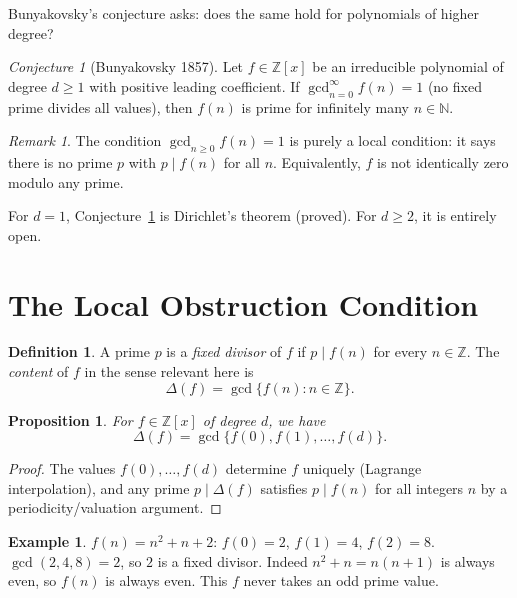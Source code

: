 \documentclass[12pt,a4paper]{amsart}
\newtheorem{proposition}[theorem]{Proposition}
\theoremstyle{definition}
\newtheorem{definition}[theorem]{Definition}
\newtheorem{example}[theorem]{Example}
\theoremstyle{remark}
\newtheorem{remark}[theorem]{Remark}
\newtheorem{conjecture}[theorem]{Conjecture}
\newcommand{\N}{\mathbb{N}}
\newcommand{\Z}{\mathbb{Z}}
\begin{document}
Bunyakovsky's conjecture asks: does the same hold for polynomials of higher degree?

\begin{conjecture}[Bunyakovsky 1857]
\label{conj:buny}
Let $f \in \Z[x]$ be an irreducible polynomial of degree $d \geq 1$
with positive leading coefficient.
If $\gcd_{n=0}^{\infty} f(n) = 1$ (no fixed prime divides all values),
then $f(n)$ is prime for infinitely many $n \in \N$.
\end{conjecture}

\begin{remark}
The condition $\gcd_{n \geq 0} f(n) = 1$ is purely a local condition:
it says there is no prime $p$ with $p \mid f(n)$ for all $n$.
Equivalently, $f$ is not identically zero modulo any prime.
\end{remark}

For $d = 1$, Conjecture~\ref{conj:buny} is Dirichlet's theorem (proved).
For $d \geq 2$, it is entirely open.

\section{The Local Obstruction Condition}

\begin{definition}
A prime $p$ is a \emph{fixed divisor} of $f$ if $p \mid f(n)$ for every
$n \in \Z$.
The \emph{content} of $f$ in the sense relevant here is
\[
  \Delta(f) = \gcd\{f(n) : n \in \Z\}.
\]
\end{definition}

\begin{proposition}
\label{prop:local}
For $f \in \Z[x]$ of degree $d$, we have
\[
  \Delta(f) = \gcd\{f(0), f(1), \ldots, f(d)\}.
\]
\end{proposition}

\begin{proof}
The values $f(0), \ldots, f(d)$ determine $f$ uniquely (Lagrange interpolation),
and any prime $p \mid \Delta(f)$ satisfies $p \mid f(n)$ for all integers $n$
by a periodicity/valuation argument.
\end{proof}

\begin{example}
$f(n) = n^2 + n + 2$: $f(0) = 2$, $f(1) = 4$, $f(2) = 8$.
$\gcd(2, 4, 8) = 2$, so $2$ is a fixed divisor.
Indeed $n^2 + n = n(n+1)$ is always even, so $f(n)$ is always even.
This $f$ never takes an odd prime value.
\end{example}
\end{document}

